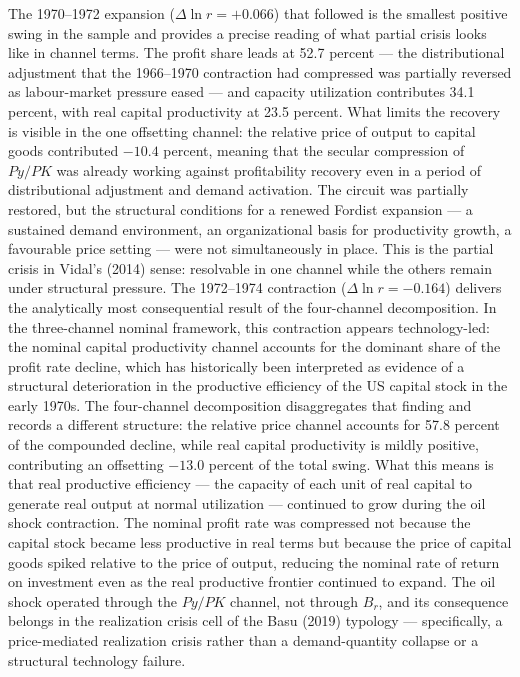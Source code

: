 
The 1970--1972 expansion ($\Delta\ln r = +0.066$) that followed is the
smallest positive swing in the sample and provides a precise reading of
what partial crisis looks like in channel terms. The profit share leads
at 52.7 percent --- the distributional adjustment that the 1966--1970
contraction had compressed was partially reversed as labour-market
pressure eased --- and capacity utilization contributes 34.1 percent,
with real capital productivity at 23.5 percent. What limits the recovery
is visible in the one offsetting channel: the relative price of output
to capital goods contributed $-10.4$ percent, meaning that the secular
compression of $Py/PK$ was already working against profitability recovery
even in a period of distributional adjustment and demand activation.
The circuit was partially restored, but the structural conditions for a
renewed Fordist expansion --- a sustained demand environment, an
organizational basis for productivity growth, a favourable price setting
--- were not simultaneously in place. This is the partial crisis in
Vidal's (2014) sense: resolvable in one channel while the others remain
under structural pressure. The 1972--1974 contraction ($\Delta\ln r =
-0.164$) delivers the analytically most consequential result of the
four-channel decomposition. In the three-channel nominal framework,
this contraction appears technology-led: the nominal capital productivity
channel accounts for the dominant share of the profit rate decline,
which has historically been interpreted as evidence of a structural
deterioration in the productive efficiency of the US capital stock in
the early 1970s. The four-channel decomposition disaggregates that
finding and records a different structure: the relative price channel
accounts for 57.8 percent of the compounded decline, while real capital
productivity is mildly positive, contributing an offsetting $-13.0$
percent of the total swing. What this means is that real productive
efficiency --- the capacity of each unit of real capital to generate
real output at normal utilization --- continued to grow during the oil
shock contraction. The nominal profit rate was compressed not because
the capital stock became less productive in real terms but because the
price of capital goods spiked relative to the price of output, reducing
the nominal rate of return on investment even as the real productive
frontier continued to expand. The oil shock operated through the
$Py/PK$ channel, not through $B_{r}$, and its consequence belongs in the
realization crisis cell of the Basu (2019) typology --- specifically, a
price-mediated realization crisis rather than a demand-quantity collapse
or a structural technology failure.

